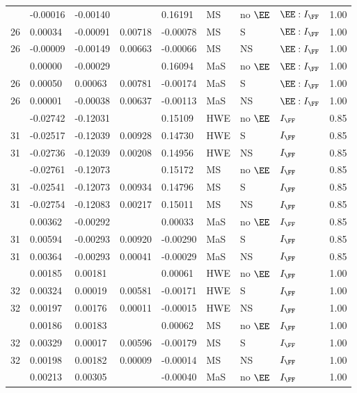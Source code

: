 \begin{longtable}[t]{lllllllll}
\addlinespace
26 & -0.00016 & -0.00140 &  & 0.16191 & MS & no $\EE$ & $\EE:I_{\FF}$ & 1.00\\
26 & 0.00034 & -0.00091 & 0.00718 & -0.00078 & MS & S & $\EE:I_{\FF}$ & 1.00\\
26 & -0.00009 & -0.00149 & 0.00663 & -0.00066 & MS & NS & $\EE:I_{\FF}$ & 1.00\\
\addlinespace
26 & 0.00000 & -0.00029 &  & 0.16094 & MaS & no $\EE$ & $\EE:I_{\FF}$ & 1.00\\
26 & 0.00050 & 0.00063 & 0.00781 & -0.00174 & MaS & S & $\EE:I_{\FF}$ & 1.00\\
26 & 0.00001 & -0.00038 & 0.00637 & -0.00113 & MaS & NS & $\EE:I_{\FF}$ & 1.00\\
\addlinespace
31 & -0.02742 & -0.12031 &  & 0.15109 & HWE & no $\EE$ & $I_{\FF}$ & 0.85\\
31 & -0.02517 & -0.12039 & 0.00928 & 0.14730 & HWE & S & $I_{\FF}$ & 0.85\\
31 & -0.02736 & -0.12039 & 0.00208 & 0.14956 & HWE & NS & $I_{\FF}$ & 0.85\\
\addlinespace
31 & -0.02761 & -0.12073 &  & 0.15172 & MS & no $\EE$ & $I_{\FF}$ & 0.85\\
31 & -0.02541 & -0.12073 & 0.00934 & 0.14796 & MS & S & $I_{\FF}$ & 0.85\\
31 & -0.02754 & -0.12083 & 0.00217 & 0.15011 & MS & NS & $I_{\FF}$ & 0.85\\
\addlinespace
31 & 0.00362 & -0.00292 &  & 0.00033 & MaS & no $\EE$ & $I_{\FF}$ & 0.85\\
31 & 0.00594 & -0.00293 & 0.00920 & -0.00290 & MaS & S & $I_{\FF}$ & 0.85\\
31 & 0.00364 & -0.00293 & 0.00041 & -0.00029 & MaS & NS & $I_{\FF}$ & 0.85\\
\addlinespace
32 & 0.00185 & 0.00181 &  & 0.00061 & HWE & no $\EE$ & $I_{\FF}$ & 1.00\\
32 & 0.00324 & 0.00019 & 0.00581 & -0.00171 & HWE & S & $I_{\FF}$ & 1.00\\
32 & 0.00197 & 0.00176 & 0.00011 & -0.00015 & HWE & NS & $I_{\FF}$ & 1.00\\
\addlinespace
32 & 0.00186 & 0.00183 &  & 0.00062 & MS & no $\EE$ & $I_{\FF}$ & 1.00\\
32 & 0.00329 & 0.00017 & 0.00596 & -0.00179 & MS & S & $I_{\FF}$ & 1.00\\
32 & 0.00198 & 0.00182 & 0.00009 & -0.00014 & MS & NS & $I_{\FF}$ & 1.00\\
\addlinespace
32 & 0.00213 & 0.00305 &  & -0.00040 & MaS & no $\EE$ & $I_{\FF}$ & 1.00\\

\end{longtable}

